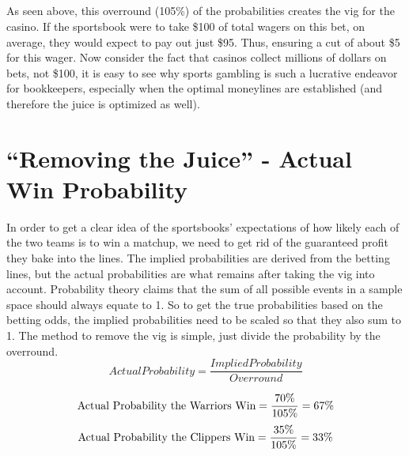 \documentclass [MS] {uclathes}
\begin{document}
\noindent {} \\
\noindent {} \\
\noindent {} \\
\noindent {} \\
\noindent {} \\
\noindent {} \\
\noindent {} \\
\noindent {} \\
\noindent {} \\


As seen above, this overround (105\%) of the probabilities creates the vig for the casino. If the sportsbook were to take \$100 of total wagers on this bet, on average, they would expect to pay out just \$95. Thus, ensuring a cut of about \$5 for this wager. Now consider the fact that casinos collect millions of dollars on bets, not \$100, it is easy to see why sports gambling is such a lucrative endeavor for bookkeepers, especially when the optimal moneylines are established (and therefore the juice is optimized as well). \\

\section{``Removing the Juice'' - Actual Win Probability}
In order to get a clear idea of the sportsbooks' expectations of how likely each of the two teams is to win a matchup, we need to get rid of the guaranteed profit they bake into the lines. The implied probabilities are derived from the betting lines, but the actual probabilities are what remains after taking the vig into account. Probability theory claims that the sum of all possible events in a sample space should always equate to 1. So to get the true probabilities based on the betting odds, the implied probabilities need to be scaled so that they also sum to 1. The method to remove the vig is simple, just divide the probability by the overround. \cite{vig}\\

$$
\displaystyle
Actual Probability = \frac{Implied Probability}
{Overround}
$$

$$
\text{Actual Probability the Warriors Win} = \frac{70\%}{105\%} = 67\% \\
$$
$$
\text{Actual Probability the Clippers Win} = \frac{35\%}{105\%} = 33\% \\
$$
\end{document}
